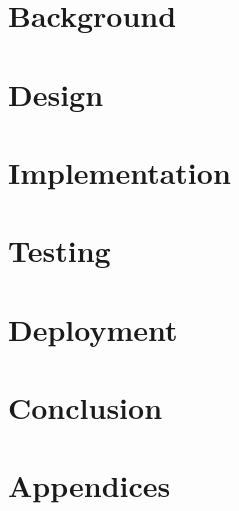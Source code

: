 \part{Background}




\part{Design}





\part{Implementation}


\part{Testing}


\part{Deployment}


\part{Conclusion}




\part{Appendices}

